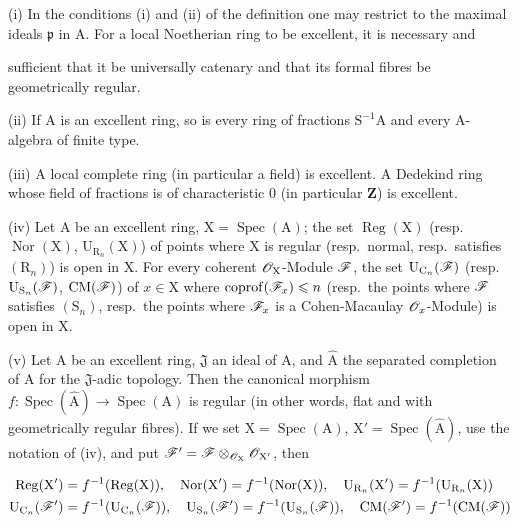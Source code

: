 \begin{scholium}[7.8.3]
\label{IV.7.8.3}
(i) In the conditions (i) and (ii) of the definition  one may restrict to the maximal ideals $\mathfrak{p}$ in $\mathrm{A}$. For a local Noetherian ring to be excellent, it is necessary and


sufficient that it be universally catenary and that its formal fibres be geometrically regular.

(ii) If $\mathrm{A}$ is an excellent ring, so is every ring of fractions $\mathrm{S}^{-1}\mathrm{A}$ and every $\mathrm{A}$-algebra of finite type.

(iii) A local complete ring (in particular a field) is excellent. A Dedekind ring whose field of fractions is of characteristic $0$ (in particular $\mathbf{Z}$) is excellent.

(iv) Let $\mathrm{A}$ be an excellent ring, $\mathrm{X}=\operatorname{Spec}(\mathrm{A})$; the set $\operatorname{Reg}(\mathrm{X})$ (resp.\ $\operatorname{Nor}(\mathrm{X})$, $\mathrm{U}_{\mathrm{R}_n}(\mathrm{X})$) of points where $\mathrm{X}$ is regular (resp.\ normal, resp.\ satisfies $(\mathrm{R}_n)$) is open in $\mathrm{X}$. For every coherent $\mathscr{O}_\mathrm{X}$-Module $\mathscr{F}$, the set $\mathrm{U}_{\mathrm{C}_n}(\mathscr{F})$ (resp.\ $\mathrm{U}_{\mathrm{S}_n}(\mathscr{F})$, $\mathrm{CM}(\mathscr{F})$) of $x\in\mathrm{X}$ where $\operatorname{coprof}(\mathscr{F}_x)\leqslant n$ (resp.\ the points where $\mathscr{F}$ satisfies $(\mathrm{S}_n)$, resp.\ the points where $\mathscr{F}_x$ is a Cohen-Macaulay $\mathscr{O}_x$-Module) is open in $\mathrm{X}$.

(v) Let $\mathrm{A}$ be an excellent ring, $\mathfrak{J}$ an ideal of $\mathrm{A}$, and $\widehat{\mathrm{A}}$ the separated completion of $\mathrm{A}$ for the $\mathfrak{J}$-adic topology. Then the canonical morphism $f:\operatorname{Spec}(\widehat{\mathrm{A}})\to\operatorname{Spec}(\mathrm{A})$ is regular (in other words, flat and with geometrically regular fibres). If we set $\mathrm{X}=\operatorname{Spec}(\mathrm{A})$, $\mathrm{X}'=\operatorname{Spec}(\widehat{\mathrm{A}})$, use the notation of (iv), and put $\mathscr{F}'=\mathscr{F}\otimes_{\mathscr{O}_\mathrm{X}}\mathscr{O}_{\mathrm{X}'}$, then

\begin{env}[7.8.3.1]
\label{IV.7.8.3.1}
\begin{align*}
  \operatorname{Reg}(\mathrm{X}')&=f^{-1}(\operatorname{Reg}(\mathrm{X})),\quad \operatorname{Nor}(\mathrm{X}')=f^{-1}(\operatorname{Nor}(\mathrm{X})),\quad \mathrm{U}_{\mathrm{R}_n}(\mathrm{X}')=f^{-1}(\mathrm{U}_{\mathrm{R}_n}(\mathrm{X}))\\
  \mathrm{U}_{\mathrm{C}_n}(\mathscr{F}')&=f^{-1}(\mathrm{U}_{\mathrm{C}_n}(\mathscr{F})),\quad \mathrm{U}_{\mathrm{S}_n}(\mathscr{F}')=f^{-1}(\mathrm{U}_{\mathrm{S}_n}(\mathscr{F})),\quad \mathrm{CM}(\mathscr{F}')=f^{-1}(\mathrm{CM}(\mathscr{F}))
\end{align*}
\end{env}


\end{scholium}
